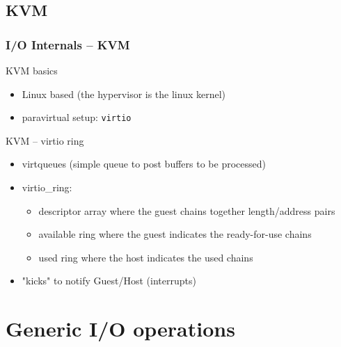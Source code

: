\documentclass[red,slidestop,notes,compress,mathserif]{beamer}
\begin{document}
\subsection{KVM}
\begin{frame}
\frametitle{I/O Internals -- KVM}

        \begin{block}{KVM basics}
                \begin{itemize}
                    \item Linux based (the hypervisor is the linux kernel)
                    \item paravirtual setup: \texttt{virtio}
                \end{itemize}
        \end{block}
        \begin{block}{KVM -- virtio ring}
                \begin{itemize}
                    \item virtqueues (simple queue to post buffers to be processed)
                    \item virtio\_ring:
                        \begin{itemize}
                            \item descriptor array where the guest chains together length/address pairs
                            \item available ring where the guest indicates the ready-for-use chains
                            \item used ring where the host indicates the used chains
                        \end{itemize}
                    \item "kicks" to notify Guest/Host (interrupts)
                \end{itemize}
        \end{block}

\end{frame}

\section{Generic I/O operations}
\end{document}
